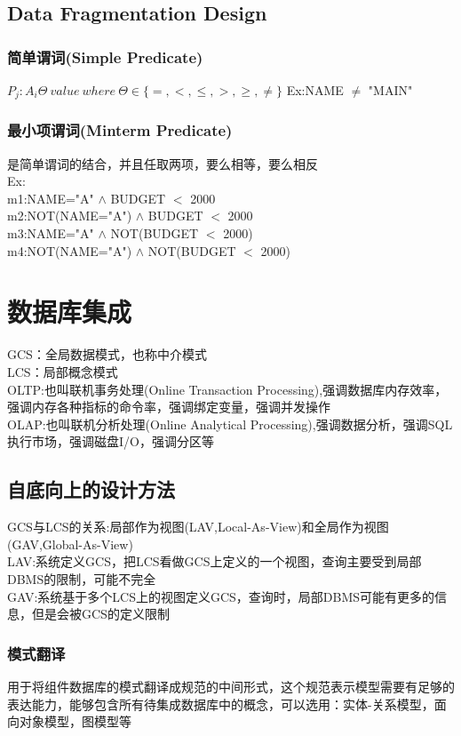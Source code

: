 \documentclass{article}
\begin{document}
\begin{CJK}{UTF8}{gbsn}
	\subsection*{Data Fragmentation Design}
	\subsubsection*{简单谓词(Simple Predicate)}
	$P_j:A_i\Theta\ value\ where\ \Theta\in\lbrace=,<,\leq,>,\geq,\neq \rbrace$
	Ex:NAME $\neq$ "MAIN"\\
	\subsubsection*{最小项谓词(Minterm Predicate)}
	是简单谓词的结合，并且任取两项，要么相等，要么相反\\
	Ex:\\
	m1:NAME="A" $\land$ BUDGET $<$ 2000\\
	m2:NOT(NAME="A") $\land$ BUDGET $<$ 2000\\
	m3:NAME="A" $\land$ NOT(BUDGET $<$ 2000)\\
	m4:NOT(NAME="A") $\land$ NOT(BUDGET $<$ 2000)\\
	
	
	\section*{数据库集成}
	GCS：全局数据模式，也称中介模式\\
	LCS：局部概念模式\\
	OLTP:也叫联机事务处理(Online Transaction Processing),强调数据库内存效率，强调内存各种指标的命令率，强调绑定变量，强调并发操作\\
	OLAP:也叫联机分析处理(Online Analytical Processing),强调数据分析，强调SQL执行市场，强调磁盘I/O，强调分区等\\
	\subsection*{自底向上的设计方法}
	GCS与LCS的关系:局部作为视图(LAV,Local-As-View)和全局作为视图(GAV,Global-As-View)\\
	LAV:系统定义GCS，把LCS看做GCS上定义的一个视图，查询主要受到局部DBMS的限制，可能不完全\\
	GAV:系统基于多个LCS上的视图定义GCS，查询时，局部DBMS可能有更多的信息，但是会被GCS的定义限制\\
	\subsubsection*{模式翻译}
	用于将组件数据库的模式翻译成规范的中间形式，这个规范表示模型需要有足够的表达能力，能够包含所有待集成数据库中的概念，可以选用：实体-关系模型，面向对象模型，图模型等\\

\end{CJK}
\end{document}
